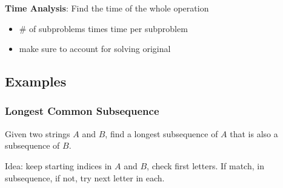 \documentclass{article}
\begin{document}
\begin{minipage}[t]{0.49\textwidth}
    \vspace{2mm}\textbf{Time Analysis}: Find the time of the whole operation
    \begin{itemize}[topsep=2pt, noitemsep]
        \item \# of subproblems times time per subproblem
        \item make sure to account for solving original
    \end{itemize}

    \subsection{Examples}
    \subsubsection{Longest Common Subsequence}
    Given two strings $A$ and $B$, find a longest subsequence of $A$ that is also a subsequence of $B$.

    Idea: keep starting indices in $A$ and $B$, check first letters. If match, in subsequence, if not, try next letter in each.

    
\end{minipage}
\hspace{.02\textwidth}
\end{document}
